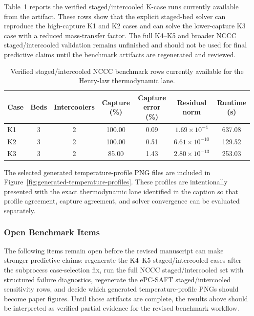         Table~\ref{tab:verified-staged-kcase-benchmark} reports the verified staged/intercooled K-case runs currently available from the  artifact. These rows show that the explicit staged-bed solver can reproduce the high-capture K1 and K2 cases and can solve the lower-capture K3 case with a reduced mass-transfer factor. The full K4--K5 and broader NCCC staged/intercooled validation remains unfinished and should not be used for final predictive claims until the benchmark artifacts are regenerated and reviewed.

        \begin{table}[htbp]
            \centering
            \small
            \caption{Verified staged/intercooled NCCC benchmark rows currently available for the Henry-law thermodynamic lane.}
            \label{tab:verified-staged-kcase-benchmark}
            \renewcommand{\arraystretch}{1.2}
            \begin{tabular}{lcccccc}
                \toprule
                \textbf{Case} & \textbf{Beds} & \textbf{Intercoolers} & \textbf{Capture (\%)} & \textbf{Capture error (\%)} & \textbf{Residual norm} & \textbf{Runtime (s)} \\
                \midrule
                K1 & 3 & 2 & 100.00 & 0.09 & $1.69\times10^{-4}$ & 637.08 \\
                K2 & 3 & 2 & 100.00 & 0.51 & $6.61\times10^{-10}$ & 129.52 \\
                K3 & 3 & 2 & 85.00 & 1.43 & $2.80\times10^{-13}$ & 253.03 \\
                \bottomrule
            \end{tabular}
        \end{table}

        The selected generated temperature-profile PNG files are included in Figure~\ref{fig:generated-temperature-profiles}. These profiles are intentionally presented with the exact thermodynamic lane identified in the caption so that profile agreement, capture agreement, and solver convergence can be evaluated separately.

        \subsubsection*{Open Benchmark Items}
            The following items remain open before the revised manuscript can make stronger predictive claims: regenerate the K4--K5 staged/intercooled cases after the subprocess case-selection fix, run the full NCCC staged/intercooled set with structured failure diagnostics, regenerate the ePC-SAFT staged/intercooled sensitivity rows, and decide which generated temperature-profile PNGs should become paper figures. Until those artifacts are complete, the results above should be interpreted as verified partial evidence for the revised benchmark workflow.
